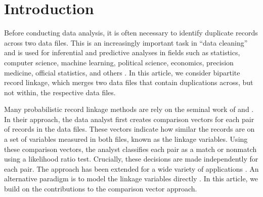 \documentclass[ba]{imsart}
\begin{document}
\begin{frontmatter}
\begin{abstract}
\end{abstract}

\begin{keyword}%
\end{keyword}

\end{frontmatter}






\section{Introduction}
\label{sec:introduction}

Before conducting data analysis, it is often necessary to identify duplicate records across two data files. This is an increasingly important task in ``data cleaning'' and is used for inferential and predictive analyses in fields such as statistics, computer science, machine learning, political science, economics, precision medicine, official statistics, and others \citep{christen_2012, gutman2013bayesian, DalzellReiter18, tang2020}. In this article, we consider bipartite record linkage, which merges two data files that contain duplications across, but not within, the respective data files. 

Many probabilistic record linkage methods are rely on the seminal work of \cite{fellegi_theory_1969} and \cite{newcombe_automatic_1959}. In their approach, the data analyst first creates comparison vectors for each pair of records in the data files. These vectors indicate how similar the records are on a set of variables measured in both files, known as the linkage variables.  Using these comparison vectors, the analyst classifies each pair as a match or nonmatch using a likelihood ratio test. Crucially, these decisions are made independently for each pair. The \cite{fellegi_theory_1969} approach has been extended for a wide variety of applications \citep[e.g.,][]{Winkler1990, fair2004generalized, wagner2014person, gill2003english, enamorado2019using, aleshinguendel2021multifile}. An alternative paradigm is to model the linkage variables directly \citep[e.g.,][]{tancredi2011hierarchical, steorts_bayesian_2016, marchant_distributed_2019, betancourt2021prior}. In this article, we build on the contributions to the comparison vector approach. 

\end{document}
